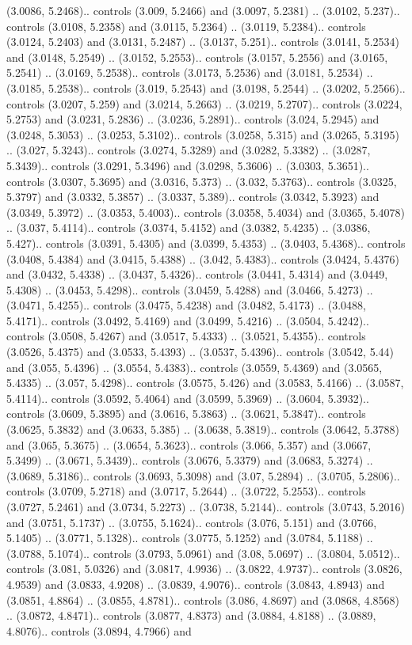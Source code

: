 (3.0086, 5.2468).. controls (3.009, 5.2466) and (3.0097, 5.2381) .. (3.0102, 5.237).. controls (3.0108, 5.2358) and (3.0115, 5.2364) .. (3.0119, 5.2384).. controls (3.0124, 5.2403) and (3.0131, 5.2487) .. (3.0137, 5.251).. controls (3.0141, 5.2534) and (3.0148, 5.2549) .. (3.0152, 5.2553).. controls (3.0157, 5.2556) and (3.0165, 5.2541) .. (3.0169, 5.2538).. controls (3.0173, 5.2536) and (3.0181, 5.2534) .. (3.0185, 5.2538).. controls (3.019, 5.2543) and (3.0198, 5.2544) .. (3.0202, 5.2566).. controls (3.0207, 5.259) and (3.0214, 5.2663) .. (3.0219, 5.2707).. controls (3.0224, 5.2753) and (3.0231, 5.2836) .. (3.0236, 5.2891).. controls (3.024, 5.2945) and (3.0248, 5.3053) .. (3.0253, 5.3102).. controls (3.0258, 5.315) and (3.0265, 5.3195) .. (3.027, 5.3243).. controls (3.0274, 5.3289) and (3.0282, 5.3382) .. (3.0287, 5.3439).. controls (3.0291, 5.3496) and (3.0298, 5.3606) .. (3.0303, 5.3651).. controls (3.0307, 5.3695) and (3.0316, 5.373) .. (3.032, 5.3763).. controls (3.0325, 5.3797) and (3.0332, 5.3857) .. (3.0337, 5.389).. controls (3.0342, 5.3923) and (3.0349, 5.3972) .. (3.0353, 5.4003).. controls (3.0358, 5.4034) and (3.0365, 5.4078) .. (3.037, 5.4114).. controls (3.0374, 5.4152) and (3.0382, 5.4235) .. (3.0386, 5.427).. controls (3.0391, 5.4305) and (3.0399, 5.4353) .. (3.0403, 5.4368).. controls (3.0408, 5.4384) and (3.0415, 5.4388) .. (3.042, 5.4383).. controls (3.0424, 5.4376) and (3.0432, 5.4338) .. (3.0437, 5.4326).. controls (3.0441, 5.4314) and (3.0449, 5.4308) .. (3.0453, 5.4298).. controls (3.0459, 5.4288) and (3.0466, 5.4273) .. (3.0471, 5.4255).. controls (3.0475, 5.4238) and (3.0482, 5.4173) .. (3.0488, 5.4171).. controls (3.0492, 5.4169) and (3.0499, 5.4216) .. (3.0504, 5.4242).. controls (3.0508, 5.4267) and (3.0517, 5.4333) .. (3.0521, 5.4355).. controls (3.0526, 5.4375) and (3.0533, 5.4393) .. (3.0537, 5.4396).. controls (3.0542, 5.44) and (3.055, 5.4396) .. (3.0554, 5.4383).. controls (3.0559, 5.4369) and (3.0565, 5.4335) .. (3.057, 5.4298).. controls (3.0575, 5.426) and (3.0583, 5.4166) .. (3.0587, 5.4114).. controls (3.0592, 5.4064) and (3.0599, 5.3969) .. (3.0604, 5.3932).. controls (3.0609, 5.3895) and (3.0616, 5.3863) .. (3.0621, 5.3847).. controls (3.0625, 5.3832) and (3.0633, 5.385) .. (3.0638, 5.3819).. controls (3.0642, 5.3788) and (3.065, 5.3675) .. (3.0654, 5.3623).. controls (3.066, 5.357) and (3.0667, 5.3499) .. (3.0671, 5.3439).. controls (3.0676, 5.3379) and (3.0683, 5.3274) .. (3.0689, 5.3186).. controls (3.0693, 5.3098) and (3.07, 5.2894) .. (3.0705, 5.2806).. controls (3.0709, 5.2718) and (3.0717, 5.2644) .. (3.0722, 5.2553).. controls (3.0727, 5.2461) and (3.0734, 5.2273) .. (3.0738, 5.2144).. controls (3.0743, 5.2016) and (3.0751, 5.1737) .. (3.0755, 5.1624).. controls (3.076, 5.151) and (3.0766, 5.1405) .. (3.0771, 5.1328).. controls (3.0775, 5.1252) and (3.0784, 5.1188) .. (3.0788, 5.1074).. controls (3.0793, 5.0961) and (3.08, 5.0697) .. (3.0804, 5.0512).. controls (3.081, 5.0326) and (3.0817, 4.9936) .. (3.0822, 4.9737).. controls (3.0826, 4.9539) and (3.0833, 4.9208) .. (3.0839, 4.9076).. controls (3.0843, 4.8943) and (3.0851, 4.8864) .. (3.0855, 4.8781).. controls (3.086, 4.8697) and (3.0868, 4.8568) .. (3.0872, 4.8471).. controls (3.0877, 4.8373) and (3.0884, 4.8188) .. (3.0889, 4.8076).. controls (3.0894, 4.7966) and 